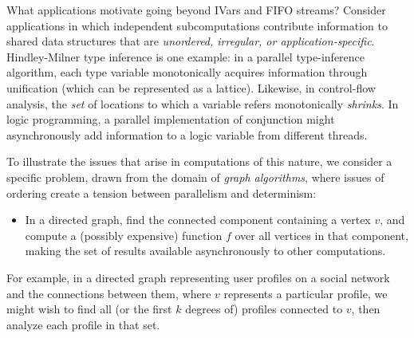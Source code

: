 What applications motivate going beyond IVars and FIFO streams?
Consider applications in which 
independent subcomputations contribute information to shared data
structures that are {\em unordered, irregular, or application-specific}.
 Hindley-Milner type inference is one example: in a
  parallel type-inference algorithm, each type variable monotonically
  acquires information through unification (which can be represented as a
  lattice).
 Likewise, in control-flow analysis, the {\em set} of locations to which a variable
 refers monotonically {\em shrinks}.  In logic programming, a parallel
 implementation of conjunction might asynchronously add information to a logic
 variable from different threads.

To illustrate the issues that arise in computations of this nature, we consider a specific problem, drawn from the domain of {\em graph algorithms}, where
 issues of ordering create a tension between parallelism and
determinism:
\begin{itemize}
\item 
  In a directed graph, 
  find the connected
  component containing a vertex $v$, and compute a (possibly expensive) function $f$ over 
all vertices in that component, making the set of results available
    asynchronously to other computations.
\end{itemize}
For example, in a directed graph representing user profiles on a social network
and the connections between them, where $v$ represents a particular
profile, we might wish to find all (or the first $k$
degrees of) profiles connected to $v$, then analyze each profile in that set.

